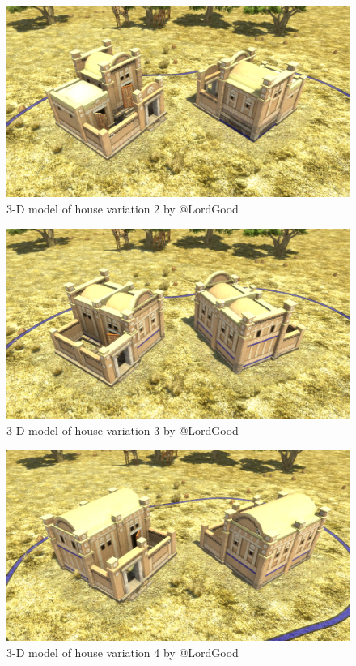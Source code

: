 \documentclass[a4paper,12pt]{scrreprt}
\begin{document}
\begin{figure}[H]
	\centering
	\includegraphics[width=\textwidth]{img/house/house_variation2}
	\caption{3-D model of house variation 2 by @LordGood}
\end{figure}

\begin{figure}[H]
	\centering
	\includegraphics[width=\textwidth]{img/house/house_variation3}
	\caption{3-D model of house variation 3 by @LordGood}
\end{figure}

\begin{figure}[H]
	\centering
	\includegraphics[width=\textwidth]{img/house/house_variation4}
	\caption{3-D model of house variation 4 by @LordGood}
\end{figure}
\end{document}
